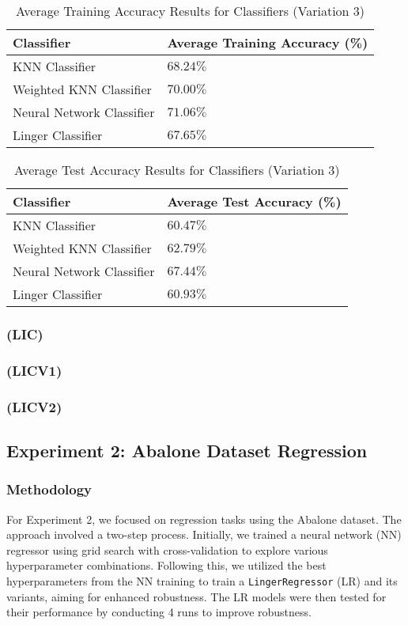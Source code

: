 \documentclass[a4paper, 12pt]{report}
\begin{document}
\begin{table}[H]
    \centering
    \caption{Average Training Accuracy Results for Classifiers (Variation 3)}
    \label{tab:average_results_train_LCV3_Glass}
    \begin{tabular}{|l|l|}
    \hline
    \textbf{Classifier} & \textbf{Average Training Accuracy (\%)} \\ \hline
    KNN Classifier & $68.24\%$ \\ \hline
    Weighted KNN Classifier & $70.00\%$ \\ \hline
    Neural Network Classifier & $71.06\%$ \\ \hline
    Linger Classifier & $67.65\%$ \\ \hline
    \end{tabular}
\end{table}

\begin{table}[H]
    \centering
    \caption{Average Test Accuracy Results for Classifiers (Variation 3)}
    \label{tab:average_results_test_LCV3_Glass}
    \begin{tabular}{|l|l|}
    \hline
    \textbf{Classifier} & \textbf{Average Test Accuracy (\%)} \\ \hline
    KNN Classifier & $60.47\%$ \\ \hline
    Weighted KNN Classifier & $62.79\%$ \\ \hline
    Neural Network Classifier & $67.44\%$ \\ \hline
    Linger Classifier & $60.93\%$ \\ \hline
    \end{tabular}
\end{table}
\subsubsection{(LIC)}
\subsubsection{(LICV1)}
\subsubsection{(LICV2)}

\subsection{Experiment 2: Abalone Dataset Regression}
\subsubsection{Methodology}
For Experiment 2, we focused on regression tasks using the Abalone dataset. 
The approach involved a two-step process. Initially, we trained a neural network (NN) regressor using grid search with 
cross-validation to explore various hyperparameter combinations. Following this, we utilized the best hyperparameters from the NN training 
to train a \texttt{LingerRegressor} (LR) and its variants, aiming for enhanced robustness. 
The LR models were then tested for their performance by conducting 4 runs to improve robustness.
\end{document}
